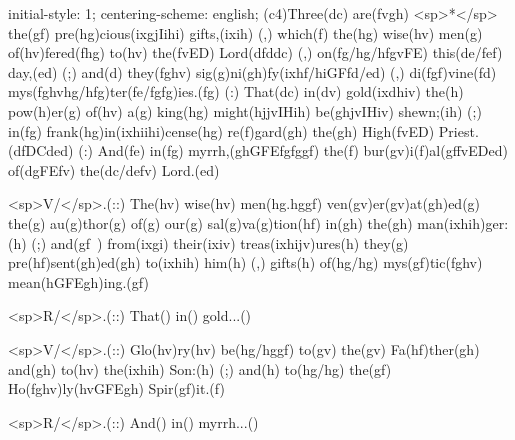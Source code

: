 initial-style: 1;
centering-scheme: english;
(c4)Three(dc) are(fvgh) <sp>*</sp> the(gf) pre(hg)cious(ixgjIihi) gifts,(ixih) (,) which(f) the(hg) wise(hv) men(g) of(hv)fered(fhg) to(hv) the(fvED) Lord(dfddc) (,) on(fg/hg/hfgvFE) this(de/fef) day,(ed) (;) and(d) they(fghv) sig(g)ni(gh)fy(ixhf/hiGFfd/ed) (,) di(fgf)vine(fd) mys(fghvhg/hfg)ter(fe/fgfg)ies.(fg) (:) That(dc) in(dv) gold(ixdhiv) the(h) pow(h)er(g) of(hv) a(g) king(hg) might(hjjvIHih) be(ghjvIHiv) shewn;(ih) (;) in(fg) frank(hg)in(ixhiihi)cense(hg) re(f)gard(gh) the(gh) High(fvED) Priest.(dfDCded) (:) And(fe) in(fg) myrrh,(ghGFEfgfggf) the(f) bur(gv)i(f)al(gffvEDed) of(dgFEfv) the(dc/defv) Lord.(ed)

<sp>V/</sp>.(::) The(hv) wise(hv) men(hg.hggf) ven(gv)er(gv)at(gh)ed(g) the(g) au(g)thor(g) of(g) our(g) sal(g)va(g)tion(hf) in(gh) the(gh) man(ixhih)ger:(h) (;) and(gf~) from(ixgi) their(ixiv) treas(ixhijv)ures(h) they(g) pre(hf)sent(gh)ed(gh) to(ixhih) him(h) (,) gifts(h) of(hg/hg) mys(gf)tic(fghv) mean(hGFEgh)ing.(gf)

<sp>R/</sp>.(::) That() in() gold...()

<sp>V/</sp>.(::) Glo(hv)ry(hv) be(hg/hggf) to(gv) the(gv) Fa(hf)ther(gh) and(gh) to(hv) the(ixhih) Son:(h) (;) and(h) to(hg/hg) the(gf) Ho(fghv)ly(hvGFEgh) Spir(gf)it.(f)

<sp>R/</sp>.(::) And() in() myrrh...()